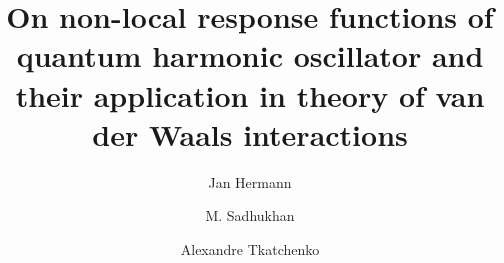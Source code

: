 \documentclass[jcp,groupaddress]{revtex4-1}
\newcommand{\diff}{\mathrm{d}}
\newcommand{\rr}{\mathbf{r}}
\begin{document}
\title{On non-local response functions of quantum harmonic oscillator and their application in theory of van der Waals interactions}
\maketitle
\author{Jan Hermann}
\author{M. Sadhukhan}
\author{Alexandre Tkatchenko}
\date{}







\end{document}
